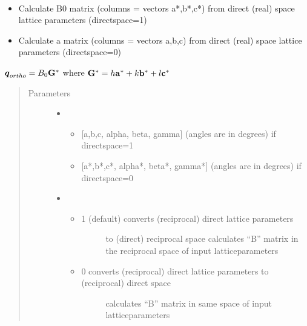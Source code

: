\documentclass[letterpaper,10pt,english]{sphinxmanual}
\begin{document}
\begin{fulllineitems}
\label{\detokenize{Simulation_Module:LaueTools.CrystalParameters.calc_B_RR}}~\begin{itemize}
\item {} 
Calculate B0 matrix (columns = vectors a*,b*,c*) from direct (real) space lattice parameters (directspace=1)

\item {} 
Calculate a matrix (columns = vectors a,b,c) from direct (real) space lattice parameters (directspace=0)

\end{itemize}

\(\boldsymbol q_{ortho}=B_0 {\bf G^*}\) where \({\bf G^*}=h{\bf a^*}+k{\bf b^*}+l{\bf c^*}\)
\begin{quote}\begin{description}
\item[{Parameters}] \leavevmode\begin{itemize}
\item {} 
 \textendash{} \begin{itemize}
\item {} 
{[}a,b,c, alpha, beta, gamma{]}    (angles are in degrees) if directspace=1

\item {} 
{[}a*,b*,c*, alpha*, beta*, gamma*{]} (angles are in degrees) if directspace=0

\end{itemize}


\item {} 
 \textendash{} \begin{itemize}
\item {} \begin{description}
\item[{1 (default) converts  (reciprocal) direct lattice parameters}] \leavevmode
to (direct) reciprocal space calculates “B” matrix in the reciprocal space of input latticeparameters

\end{description}

\item {} \begin{description}
\item[{0  converts  (reciprocal) direct lattice parameters to (reciprocal) direct space}] \leavevmode
calculates “B” matrix in same space of  input latticeparameters


\end{description}
\end{itemize}
\end{itemize}
\end{description}
\end{quote}
\end{fulllineitems}
\end{document}
